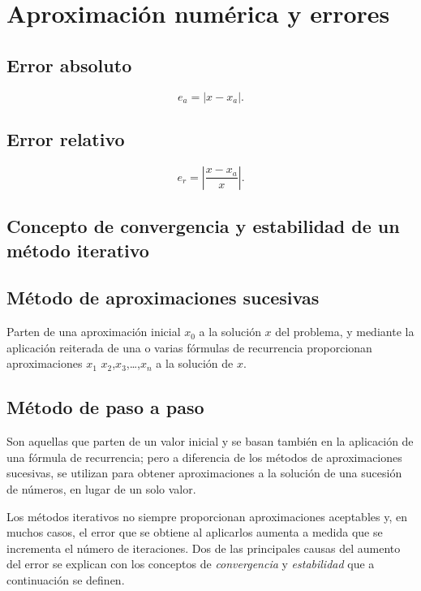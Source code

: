 \documentclass[
	a4paper,
	11pt,
	oneside
]{scrreprt}
\begin{document}
\chapter{Aproximación numérica y errores}

\section{Error absoluto}

\[ e_{a}=\left|x-x_{a}\right|. \]

\section{Error relativo}

\[e_{r}=\left|\frac{x-x_{a}}{x}\right|. \]

\section{Concepto de convergencia y estabilidad de un método iterativo}

\section{Método de aproximaciones sucesivas}

Parten de una aproximación inicial $x_{0}$ a la solución $x$ del problema, y mediante la aplicación reiterada de una o varias fórmulas de recurrencia proporcionan aproximaciones $x_{1}$ $x_{2}$,$x_{3}$,\ldots,$x_{n}$ a la solución de $x$.

\section{Método de paso a paso}

Son aquellas que parten de un valor inicial y se basan también en la aplicación de una fórmula de recurrencia; pero a diferencia de los métodos de aproximaciones sucesivas, se utilizan para obtener aproximaciones a la solución de una sucesión de números, en lugar de un solo valor.

Los métodos iterativos no siempre proporcionan aproximaciones aceptables y, en muchos casos, el error que se obtiene al aplicarlos aumenta a medida que se incrementa el número de iteraciones. Dos de las principales causas del aumento del error se explican con los conceptos de \textit{convergencia} y \textit{estabilidad} que a continuación se definen.
\end{document}
